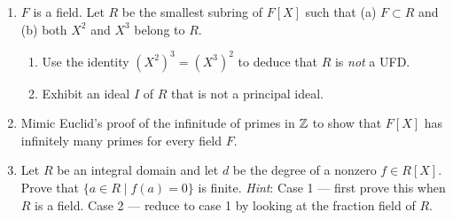 \documentclass[../psets.tex]{subfiles}
\begin{document}
\begin{enumerate}
\begin{center}
    \end{center}
    \item $F$ is a field. Let $R$ be the smallest subring of $F[X]$ such that (a) $F\subset R$ and (b) both $X^2$ and $X^3$ belong to $R$.
    \begin{enumerate}[label={(\alph*)}]
        \item Use the identity $(X^2)^3=(X^3)^2$ to deduce that $R$ is \emph{not} a UFD.
        \item Exhibit an ideal $I$ of $R$ that is not a principal ideal.
    \end{enumerate}
    \item Mimic Euclid's proof of the infinitude of primes in $\mathbb{Z}$ to show that $F[X]$ has infinitely many primes for every field $F$.
    \item Let $R$ be an integral domain and let $d$ be the degree of a nonzero $f\in R[X]$. Prove that $\{a\in R\mid f(a)=0\}$ is finite. \emph{Hint}: Case 1 --- first prove this when $R$ is a field. Case 2 --- reduce to case 1 by looking at the fraction field of $R$.
\end{enumerate}
\end{document}
